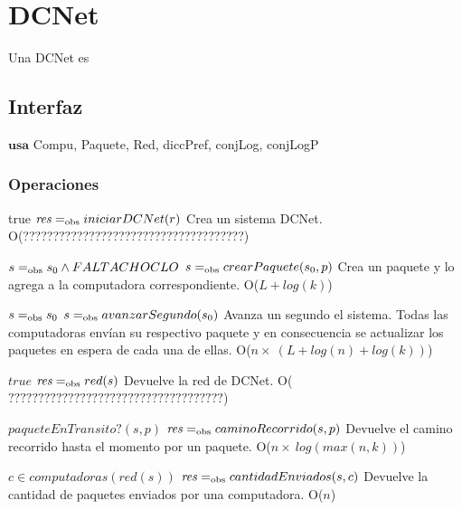 
\section{DCNet}

Una DCNet es

\subsection{Interfaz}

$\textbf{usa}$  
Compu, Paquete, Red, diccPref, conjLog, conjLogP


\subsubsection*{Operaciones}


 {true}
 {$\text{\textit{res}} =_{\mathrm{obs}} iniciarDCNet(r)$}
 {Crea un sistema DCNet.}
 {O(?????????????????????????????????????)}

 {$s =_{\mathrm{obs}} s_0 \land FALTA CHOCLO$}
 {$s =_{\mathrm{obs}} crearPaquete(s_0, p)$}
 {Crea un paquete y lo agrega a la computadora correspondiente.}
 {O($L + log(k)$)}

 {$s =_{\mathrm{obs}} s_0$}
 {$s =_{\mathrm{obs}} avanzarSegundo(s_0)$}
 {Avanza un segundo el sistema. Todas las computadoras envían su respectivo paquete y en consecuencia se actualizar los paquetes en espera de cada una de ellas.}
 {O($n \times\ (L + log(n) + log(k))$)}

 {$true$}
 {$\text{\textit{res}} =_{\mathrm{obs}} red(s)$}
 {Devuelve la red de DCNet.}
 {O($????????????????????????????????????$)}

 {$paqueteEnTransito?(s,p)$}
 {$\text{\textit{res}} =_{\mathrm{obs}} caminoRecorrido(s,p)$}
 {Devuelve el camino recorrido hasta el momento por un paquete.}
 {O($n \times\  log(max(n,k))$)}

 {$c \in computadoras(red(s))$}
 {$\text{\textit{res}} =_{\mathrm{obs}} cantidadEnviados(s,c)$}
 {Devuelve la cantidad de paquetes enviados por una computadora.}
 {O($n$)} %

